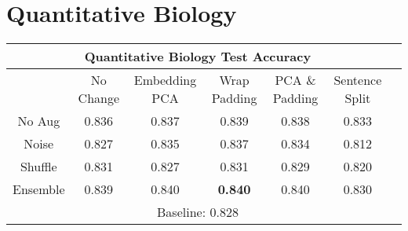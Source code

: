 \section{Quantitative Biology}
\begin{center}
\begin{tabular}{|c||c|c|c|c|c|c|}
  \hline
\multicolumn{6}{|c|}{\textbf{Quantitative Biology Test Accuracy}}\\ \hline
  & No Change & Embedding PCA & Wrap Padding & PCA \& Padding & Sentence Split\\  \hline
  No Aug & 0.836 & 0.837 & 0.839 & 0.838 & 0.833 \\      \hline
  Noise & 0.827 & 0.835 & 0.837 & 0.834 & 0.812  \\      \hline
  Shuffle & 0.831 & 0.827 & 0.831 & 0.829 & 0.820 \\      \hline
  Ensemble & 0.839 & 0.840 & \textbf{0.840} & 0.840 & 0.830 \\      \hline
  \multicolumn{6}{|c|}{Baseline: 0.828}\\ \hline
\end{tabular}
\end{center}

